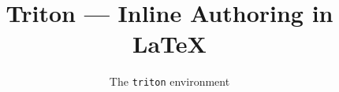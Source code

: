 %
%
%

\documentclass{article}
\usepackage[margin=1in]{geometry}
\usepackage{triton}


\title{Triton --- Inline Authoring in \LaTeX}
\author{The \texttt{triton} environment}
\date{}


\maketitle

The diagram below is written as \emph{source} directly in this \texttt{.tex}
file, inside a \verb|\begin{triton}…\end{triton}| environment, and rendered to a
vector PDF at compile time --- exactly like \texttt{tikzpicture}.

\section{A flowchart, authored inline}

\begin{center}
\begin{triton}
flowchart LR
  A[Start] --> B{Choice}
  B -->|yes| C[Ship it]
  B -->|no| D[Fix it]
  D --> E[Review]
\end{triton}
\end{center}

\section{Per-diagram sizing}

A verbatim environment cannot carry an inline optional argument, so the
\verb|\includegraphics| options for the next diagram are set just before it with
\verb|\tritonnext|:

\begin{center}
\begin{triton}
flowchart TD
  P[Parse] --> L[Layout]
  L --> R[Render]
\end{triton}
\end{center}


